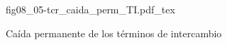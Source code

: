 \begin{figure}[h]
\centering
\def\svgwidth{0.5\textwidth}
{fig08_05-tcr_caida_perm_TI.pdf_tex}
\caption{Caída permanente de los términos de intercambio}
\label{fig08_05-tcr_caida_perm_TI}
\end{figure}